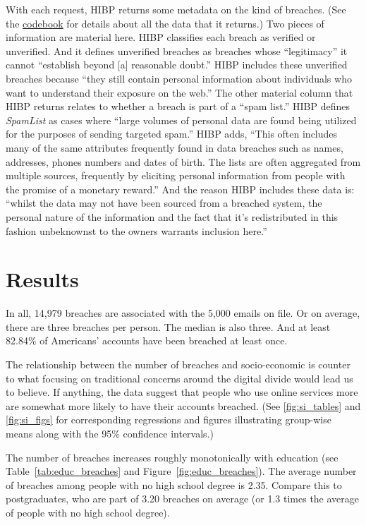 \documentclass[sigconf]{acmart}
\begin{document}
With each request, HIBP returns some metadata on the kind of breaches. (See the \href{https://github.com/themains/pwned/blob/master/data/Profile_codebook_ygov1058.pdf}{codebook} for details about all the data that it returns.) Two pieces of information are material here. HIBP classifies each breach as verified or unverified. And it defines unverified breaches as breaches whose ``legitimacy'' it cannot ``establish beyond [a] reasonable doubt.'' HIBP includes these unverified breaches because ``they still contain personal information about individuals who want to understand their exposure on the web.'' The other material column that HIBP returns relates to whether a breach is part of a ``spam list.'' HIBP defines {\it SpamList} as cases where ``large volumes of personal data are found being utilized for the purposes of sending targeted spam.'' HIBP adds, ``This often includes many of the same attributes frequently found in data breaches such as names, addresses, phones numbers and dates of birth. The lists are often aggregated from multiple sources, frequently by eliciting personal information from people with the promise of a monetary reward.'' And the reason HIBP includes these data is: ``whilst the data may not have been sourced from a breached system, the personal nature of the information and the fact that it's redistributed in this fashion unbeknownst to the owners warrants inclusion here.''

\section{Results}

In all, 14,979 breaches are associated with the 5,000 emails on file. Or on average, there are three breaches per person. The median is also three. And at least 82.84\% of Americans' accounts have been breached at least once. 

The relationship between the number of breaches and socio-economic is counter to what focusing on traditional concerns around the digital divide would lead us to believe. If anything, the data suggest that people who use online services more are somewhat more likely to have their accounts breached. (See \ref{fig:si_tables} and \ref{fig:si_figs} for corresponding regressions and figures illustrating group-wise means along with the 95\% confidence intervals.) 

The number of breaches increases roughly monotonically with education (see Table~\ref{tab:educ_breaches} and Figure~\ref{fig:educ_breaches}). The average number of breaches among people with no high school degree is 2.35. Compare this to postgraduates, who are part of 3.20 breaches on average (or 1.3 times the average of people with no high school degree).
\end{document}
